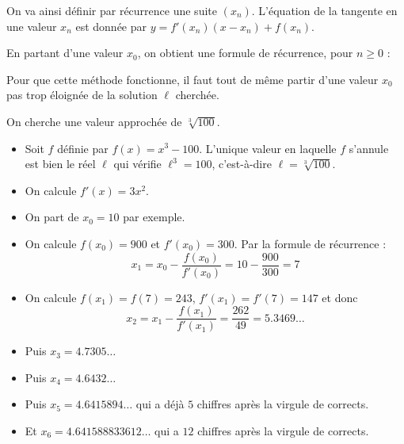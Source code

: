 \documentclass[11pt,class=report,crop=false]{standalone}
\begin{document}
On va ainsi définir par récurrence une suite $(x_n)$.  
L'équation de la tangente en une valeur $x_n$ est donnée par 
$y = f'(x_n)(x-x_n)+f(x_n)$. %


En partant d'une valeur $x_0$, on obtient une formule de récurrence, pour $n\ge0$  :


Pour que cette méthode fonctionne, il faut tout de même partir d'une valeur $x_0$ pas trop éloignée de la solution $\ell$ cherchée.

\begin{exemple}
On cherche une valeur approchée de $\sqrt[3]{100}$.

\begin{itemize}
  \item Soit $f$ définie par $f(x)=x^3-100$. L'unique valeur en laquelle $f$ s'annule est bien le réel $\ell$ qui vérifie $\ell^3=100$, c'est-à-dire $\ell = \sqrt[3]{100}$.
  
  \item On calcule $f'(x) = 3x^2$.
  
  \item On part de $x_0=10$ par exemple.
  
  \item On calcule $f(x_0) = 900$ et $f'(x_0) = 300$. Par la formule de récurrence :
  $$x_1 = x_0 - \frac{f(x_0)}{f'(x_0)} =10-\frac{900}{300} = 7$$
  
  \item On calcule $f(x_1) = f(7) = 243$, $f'(x_1) = f'(7) = 147$ et donc
  $$x_2 = x_1 - \frac{f(x_1)}{f'(x_1)} = \frac{262}{49} = 5.3469\ldots$$ 
  
  \item Puis $x_3 = 4.7305\ldots$
  
  \item Puis $x_4 = 4.6432\ldots$ 
  
  \item Puis $x_5 = 4.6415894\ldots$   qui a déjà $5$ chiffres après la virgule de corrects.
  
  \item Et $x_6 = 4.641588833612\ldots$  qui a $12$ chiffres après la virgule de corrects. 
\end{itemize}


\end{exemple}
\end{document}
